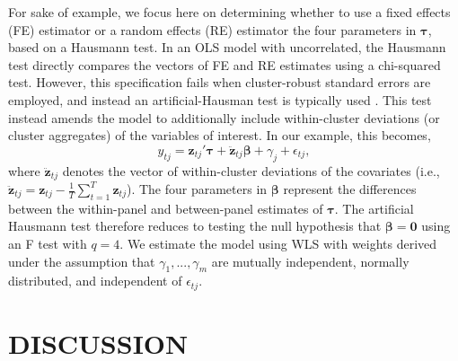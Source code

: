 \documentclass[12pt]{article}
\newcommand{\bm}{\mathbf}
\newcommand{\bs}{\boldsymbol}
\begin{document}
For sake of example, we focus here on determining whether to use a fixed effects (FE) estimator or a random effects (RE) estimator the four parameters in $\bs\tau$, based on a Hausmann test. In an OLS model with uncorrelated, the Hausmann test directly compares the vectors of FE and RE estimates using a chi-squared test. However, this specification fails when cluster-robust standard errors are employed, and instead an artificial-Hausman test \citep{Arellano1993on} is typically used \citep[pp. 290-291]{Wooldridge2002econometric}. This test instead amends the model to additionally include within-cluster deviations (or cluster aggregates) of the variables of interest. In our example, this becomes,
\begin{equation}
y_{tj} = \bm{z}_{tj}'\bs\tau + \bm{\ddot{z}}_{tj}\bs\beta + \gamma_j + \epsilon_{tj},
\end{equation}
where $\bm{\ddot{z}}_{tj}$ denotes the vector of within-cluster deviations of the covariates (i.e., $\bm{\ddot{z}}_{tj} = \bm{z}_{tj} - \frac{1}{T}\sum_{t=1}^T \bm{z}_{tj}$).
The four parameters in $\bs\beta$ represent the differences between the within-panel and between-panel estimates of $\bs\tau$. The artificial Hausmann test therefore reduces to testing the null hypothesis that $\bs\beta = \bm{0}$ using an F test with $q = 4$. We estimate the model using WLS with weights derived under the assumption that  $\gamma_1,...,\gamma_m$ are mutually independent, normally distributed, and independent of $\epsilon_{tj}$.


\section{DISCUSSION}
\label{sec:discussion}

\end{document}
